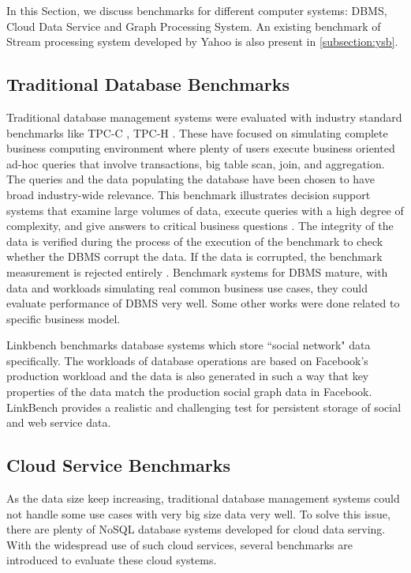 In this Section, we discuss benchmarks for different computer systems: DBMS, Cloud Data Service and Graph Processing System. An existing benchmark of Stream processing system developed by Yahoo is also present in \cref{subsection:ysb}. 

\subsection{Traditional Database Benchmarks}
Traditional database management systems were evaluated with industry standard benchmarks like TPC-C \cite{TPC-C}, TPC-H \cite{TPC-H}. These have focused on simulating complete business computing environment where plenty of users execute business oriented ad-hoc queries that involve transactions, big table scan, join, and aggregation. The queries and the data populating the database have been chosen to have broad industry-wide relevance. This benchmark illustrates decision support systems that examine large volumes of data, execute queries with a high degree of complexity, and give answers to critical business questions \cite{TPC-H}. The integrity of the data is verified during the process of the execution of the benchmark to check whether the DBMS corrupt the data. If the data is corrupted, the benchmark measurement is rejected entirely \cite{dey2014ycsb+t}. Benchmark systems for DBMS mature, with data and workloads simulating real common business use cases, they could evaluate performance of DBMS very well. Some other works were done related to specific business model. 

Linkbench \cite{LinkBench} benchmarks database systems which store ``social network" data specifically. The workloads of database operations are based on Facebook's production workload and the data is also generated in such a way that key properties of the data match the production social graph data in Facebook. LinkBench provides a realistic and challenging test for persistent storage of social and web service data. 

\subsection{Cloud Service Benchmarks}
As the data size keep increasing, traditional database management systems could not handle some use cases with very big size data very well. To solve this issue, there are plenty of NoSQL database systems developed for cloud data serving. With the widespread use of such cloud services, several benchmarks are introduced to evaluate these cloud systems.


